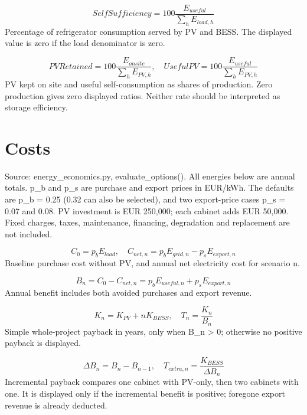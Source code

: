 \documentclass[10pt,a4paper]{article}
\begin{document}
\begin{equation}
SelfSufficiency=100\frac{E_{useful}}{\sum_h E_{load,h}}
\end{equation}
Percentage of refrigerator consumption served by PV and BESS. The displayed value is zero if the load denominator is zero.

\begin{equation}
PVRetained=100\frac{E_{onsite}}{\sum_h E_{PV,h}},\quad UsefulPV=100\frac{E_{useful}}{\sum_h E_{PV,h}}
\end{equation}
PV kept on site and useful self-consumption as shares of production. Zero production gives zero displayed ratios. Neither rate should be interpreted as storage efficiency.

\section{Costs}
Source: energy\_economics.py, evaluate\_options(). All energies below are annual totals. p\_b and p\_s are purchase and export prices in EUR/kWh. The defaults are p\_b = 0.25 (0.32 can also be selected), and two export-price cases p\_s = 0.07 and 0.08. PV investment is EUR 250,000; each cabinet adds EUR 50,000. Fixed charges, taxes, maintenance, financing, degradation and replacement are not included.

\begin{equation}
C_0=p_bE_{load},\quad C_{net,n}=p_bE_{grid,n}-p_sE_{export,n}
\end{equation}
Baseline purchase cost without PV, and annual net electricity cost for scenario n.

\begin{equation}
B_n=C_0-C_{net,n}=p_bE_{useful,n}+p_sE_{export,n}
\end{equation}
Annual benefit includes both avoided purchases and export revenue.

\begin{equation}
K_n=K_{PV}+nK_{BESS},\quad T_n=\frac{K_n}{B_n}
\end{equation}
Simple whole-project payback in years, only when B\_n > 0; otherwise no positive payback is displayed.

\begin{equation}
\Delta B_n=B_n-B_{n-1},\quad T_{extra,n}=\frac{K_{BESS}}{\Delta B_n}
\end{equation}
Incremental payback compares one cabinet with PV-only, then two cabinets with one. It is displayed only if the incremental benefit is positive; foregone export revenue is already deducted.
\end{document}
